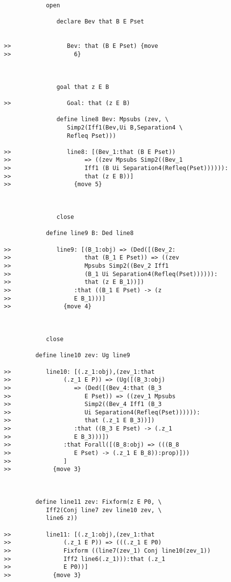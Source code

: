 \documentclass[12pt]{article}
\begin{document}
\begin{verbatim}
            open

               declare Bev that B E Pset


>>                Bev: that (B E Pset) {move
>>                  6}



               goal that z E B

>>                Goal: that (z E B)

               define line8 Bev: Mpsubs (zev, \
                  Simp2(Iff1(Bev,Ui B,Separation4 \
                  Refleq Pset)))

>>                line8: [(Bev_1:that (B E Pset))
>>                     => ((zev Mpsubs Simp2((Bev_1
>>                     Iff1 (B Ui Separation4(Refleq(Pset)))))):
>>                     that (z E B))]
>>                  {move 5}



               close

            define line9 B: Ded line8

>>             line9: [(B_1:obj) => (Ded([(Bev_2:
>>                     that (B_1 E Pset)) => ((zev
>>                     Mpsubs Simp2((Bev_2 Iff1
>>                     (B_1 Ui Separation4(Refleq(Pset)))))):
>>                     that (z E B_1))])
>>                  :that ((B_1 E Pset) -> (z
>>                  E B_1)))]
>>               {move 4}



            close

         define line10 zev: Ug line9

>>          line10: [(.z_1:obj),(zev_1:that
>>               (.z_1 E P)) => (Ug([(B_3:obj)
>>                  => (Ded([(Bev_4:that (B_3
>>                     E Pset)) => ((zev_1 Mpsubs
>>                     Simp2((Bev_4 Iff1 (B_3
>>                     Ui Separation4(Refleq(Pset)))))):
>>                     that (.z_1 E B_3))])
>>                  :that ((B_3 E Pset) -> (.z_1
>>                  E B_3)))])
>>               :that Forall([(B_8:obj) => (((B_8
>>                  E Pset) -> (.z_1 E B_8)):prop)]))
>>               ]
>>            {move 3}



         define line11 zev: Fixform(z E P0, \
            Iff2(Conj line7 zev line10 zev, \
            line6 z))

>>          line11: [(.z_1:obj),(zev_1:that
>>               (.z_1 E P)) => (((.z_1 E P0)
>>               Fixform ((line7(zev_1) Conj line10(zev_1))
>>               Iff2 line6(.z_1))):that (.z_1
>>               E P0))]
>>            {move 3}




\end{verbatim}
\end{document}
